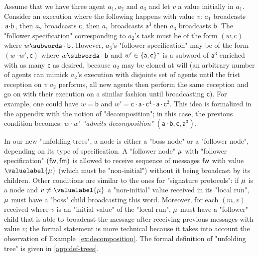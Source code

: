 \begin{example}

\label{ex:decomposition}
Assume that we have three agent $a_1,a_2$ and $a_3$ and let $v$ a value initially in $a_1$. Consider an execution where the following happens with value $v$: $a_1$ broadcasts $\textsf{a} \cdot \textsf{b}$, then $a_2$ broadcasts $\textsf{c}$, then $a_1$ broadcasts $\textsf{a}^3$ then $a_3$ broadcasts $\textsf{b}$. The "follower specification" corresponding to $a_2$'s task must be of the form $(w, \textsf{c})$ where $w \subword \textsf{a} \cdot \textsf{b}$. However, $a_3$'s "follower specification" may be of the form $(w \cdot w', \textsf{c})$ where $w \subword \textsf{a} \cdot \textsf{b}$ and $w' \in \{\textsf{a},\textsf{c}\}^*$ is a subword of $\textsf{a}^3$ enriched with as many $\textsf{c}$ as desired, because $a_2$ may be cloned at will (an arbitrary number of agents can mimick $a_2$'s execution with disjoints set of agents until the frist reception on $v$ $a_2$ performs, all new agents then perform the same reception and go on with their execution on a similar fashion until broadcasting $\textsf{c}$). For example, one could have $w= \textsf{b} $ and $w' = \textsf{c} \cdot \textsf{a} \cdot \textsf{c}^4 \cdot \textsf{a} \cdot \textsf{c}^2$. This idea is formalized in the appendix with the notion of "decomposition"; in this case, the previous condition becomes: $w \cdot w'$ \emph{"admits decomposition"} $(\textsf{a} \cdot \textsf{b}, \textsf{c}, \textsf{a}^3)$.   

\end{example}

In our new "unfolding trees", a node is either a "boss node" or a "follower node", depending on its type of specification. 
A "follower node" $\mu$ with "follower specification" $(\mathsf{fw}, \mathsf{fm})$ is allowed to receive sequence of messages $\mathsf{fw}$ with value $\valuelabel{\node}$ (which must be "non-initial") without it being broadcast by its children. 
Other conditions are similar to the ones for "signature protocols": if $\mu$ is a node and $v \ne \valuelabel{\node}$ a "non-initial" value received in its "local run", $\mu$ must have a "boss" child broadcasting this word. Moreover, for each $(m,v)$ received where $v$ is an "initial value" of the "local run", $\mu$ must have a "follower" child that is able to broadcast the message after receiving previous messages with value $v$; the formal statement is more technical because it takes into account the observation of Example~\ref{ex:decomposition}. 
The formal definition of "unfolding tree" is given in \cref{app:def-trees}.


